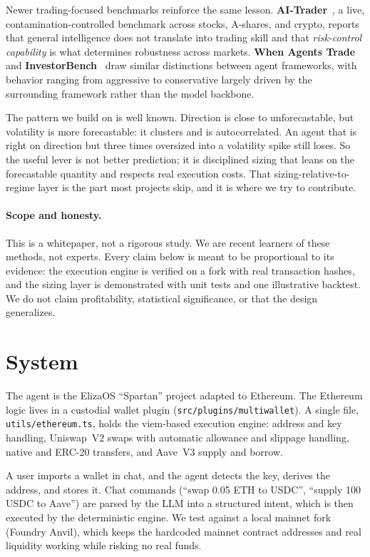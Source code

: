 \documentclass[11pt]{article}
\newcommand{\code}[1]{\texttt{#1}}
\begin{document}
Newer trading-focused benchmarks reinforce the same lesson. \textbf{AI-Trader}~\cite{aitrader}, a
live, contamination-controlled benchmark across stocks, A-shares, and crypto, reports that general
intelligence does not translate into trading skill and that \emph{risk-control capability} is what
determines robustness across markets. \textbf{When Agents Trade}~\cite{ama} and
\textbf{InvestorBench}~\cite{investorbench} draw similar distinctions between agent frameworks, with
behavior ranging from aggressive to conservative largely driven by the surrounding framework rather
than the model backbone.

The pattern we build on is well known. Direction is close to unforecastable, but volatility is more
forecastable: it clusters and is autocorrelated. An agent that is right on direction but three times
oversized into a volatility spike still loses. So the useful lever is not better prediction; it is
disciplined sizing that leans on the forecastable quantity and respects real execution costs. That
sizing-relative-to-regime layer is the part most projects skip, and it is where we try to
contribute.

\paragraph{Scope and honesty.} This is a whitepaper, not a rigorous study. We are recent learners of
these methods, not experts. Every claim below is meant to be proportional to its evidence: the
execution engine is verified on a fork with real transaction hashes, and the sizing layer is
demonstrated with unit tests and one illustrative backtest. We do not claim profitability, statistical
significance, or that the design generalizes.

\section{System}\label{sec:system}
The agent is the ElizaOS ``Spartan'' project adapted to Ethereum. The Ethereum logic lives in a
custodial wallet plugin (\code{src/plugins/multiwallet}). A single file, \code{utils/ethereum.ts},
holds the viem-based execution engine: address and key handling, Uniswap~V2 swaps with automatic
allowance and slippage handling, native and ERC-20 transfers, and Aave~V3 supply and borrow.

A user imports a wallet in chat, and the agent detects the key, derives the address, and stores it.
Chat commands (``swap 0.05 ETH to USDC'', ``supply 100 USDC to Aave'') are parsed by the LLM into a
structured intent, which is then executed by the deterministic engine. We test against a local
mainnet fork (Foundry Anvil), which keeps the hardcoded mainnet contract addresses and real liquidity
working while risking no real funds.
\end{document}
